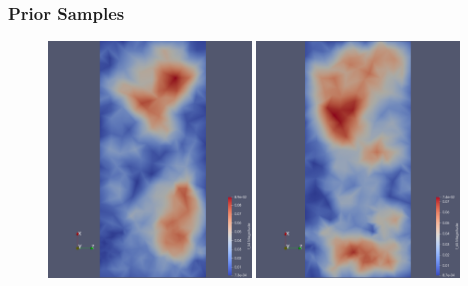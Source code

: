 \documentclass[
  pdf,
  10pt,
  xcolor={svgnames},
]{beamer}
\begin{document}
\begin{frame}
  \frametitle{Prior Samples}
  \begin{figure}
    \centering
    \includegraphics[width=0.48\textwidth]{./resources/prior_sample_1}
    \includegraphics[width=0.48\textwidth]{./resources/prior_sample_2}
  \end{figure}
\end{frame}
\end{document}
